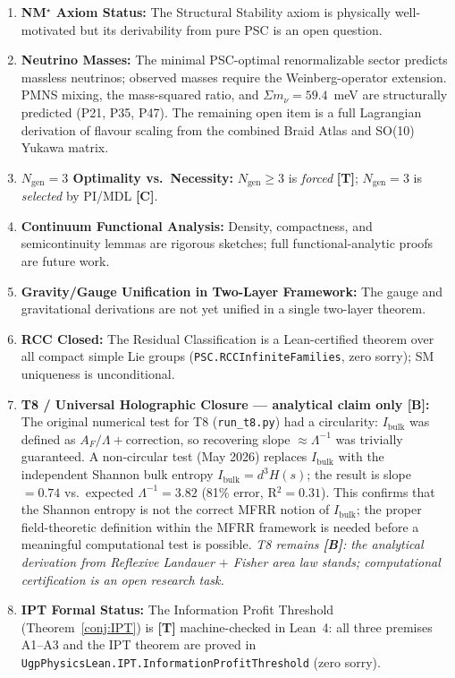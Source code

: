 \documentclass[11pt]{article}
\newcommand{\tagT}{\textbf{[T]}}
\newcommand{\tagB}{\textbf{[B]}}
\newcommand{\tagC}{\textbf{[C]}}
\theoremstyle{plain}
\theoremstyle{definition}
\theoremstyle{remark}
\begin{document}
\begin{enumerate}[label=(\roman*)]
\item \textbf{NM$^\star$ Axiom Status:}
The Structural Stability axiom is physically well-motivated but its derivability
from pure PSC is an open question.

\item \textbf{Neutrino Masses:}
The minimal PSC-optimal renormalizable sector predicts massless neutrinos; observed masses require the Weinberg-operator extension.
PMNS mixing, the mass-squared ratio, and $\Sigma m_\nu = 59.4$~meV are structurally predicted (P21, P35, P47).
The remaining open item is a full Lagrangian derivation of flavour scaling from the combined Braid Atlas and SO(10) Yukawa matrix.

\item \textbf{$N_\mathrm{gen} = 3$ Optimality vs.\ Necessity:}
$N_\mathrm{gen} \ge 3$ is \emph{forced} \tagT{}; $N_\mathrm{gen} = 3$ is \emph{selected} by PI/MDL \tagC{}.

\item \textbf{Continuum Functional Analysis:}
Density, compactness, and semicontinuity lemmas are rigorous sketches;
full functional-analytic proofs are future work.

\item \textbf{Gravity/Gauge Unification in Two-Layer Framework:}
The gauge and gravitational derivations are not yet unified in a single two-layer theorem.

\item \textbf{RCC Closed:}
The Residual Classification is a Lean-certified theorem over all compact simple
Lie groups (\texttt{PSC.RCCInfiniteFamilies}, zero sorry); SM uniqueness is unconditional.

\item \textbf{T8 / Universal Holographic Closure --- analytical claim only \tagB{}:}
The original numerical test for T8 (\texttt{run\_t8.py}) had a circularity: $I_\mathrm{bulk}$ was
defined as $A_F/\Lambda + \mathrm{correction}$, so recovering slope $\approx\Lambda^{-1}$ was
trivially guaranteed. A non-circular test (May 2026) replaces $I_\mathrm{bulk}$ with the
independent Shannon bulk entropy $I_\mathrm{bulk} = d^3 H(s)$; the result is
slope $= 0.74$ vs.\ expected $\Lambda^{-1} = 3.82$ (81\% error, R$^2=0.31$).
This confirms that the Shannon entropy is not the correct MFRR notion of
$I_\mathrm{bulk}$; the proper field-theoretic definition within the MFRR framework
is needed before a meaningful computational test is possible.
\emph{T8 remains \tagB{}: the analytical derivation from Reflexive Landauer $+$ Fisher area law stands;
computational certification is an open research task.}

\item \textbf{IPT Formal Status:}
The Information Profit Threshold (Theorem~\ref{conj:IPT}) is \tagT{} machine-checked in Lean~4: all three premises A1--A3 and the IPT theorem are proved in \texttt{UgpPhysicsLean.IPT.InformationProfitThreshold} (zero sorry).
\end{enumerate}
\end{document}
